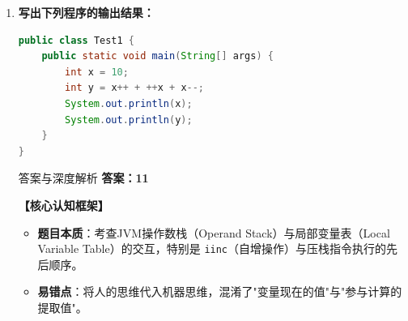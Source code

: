\documentclass[12pt, a4paper]{ctexart}
\begin{document}
\begin{enumerate}[label=\textbf{\arabic*.}]
	\item \textbf{写出下列程序的输出结果：}
	      \begin{lstlisting}[language=Java]
public class Test1 {
    public static void main(String[] args) {
        int x = 10;
        int y = x++ + ++x + x--;
        System.out.println(x);
        System.out.println(y);
    }
}
\end{lstlisting}

	      \begin{bluebox}{答案与深度解析}
		      \textbf{答案：11 }

		      \textbf{【核心认知框架】}
		      \begin{itemize}[leftmargin=*, nosep]
			      \item \textbf{题目本质}：考查JVM操作数栈（Operand Stack）与局部变量表（Local Variable Table）的交互，特别是 \texttt{iinc}（自增操作）与压栈指令执行的先后顺序。
			      \item \textbf{易错点}：将人的思维代入机器思维，混淆了"变量现在的值"与"参与计算的提取值"。
		      \end{itemize}


\end{bluebox}
\end{enumerate}
\end{document}
